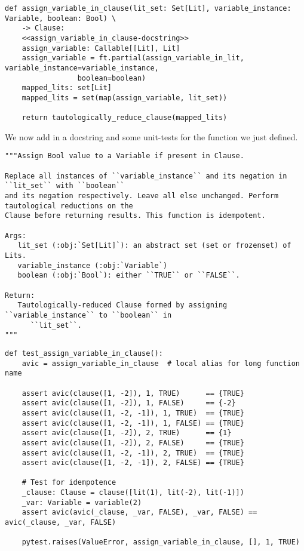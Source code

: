 \documentclass[11pt]{article}
\begin{document}
\begin{verbatim}
def assign_variable_in_clause(lit_set: Set[Lit], variable_instance: Variable, boolean: Bool) \
	-> Clause:
    <<assign_variable_in_clause-docstring>>
    assign_variable: Callable[[Lit], Lit]
    assign_variable = ft.partial(assign_variable_in_lit, variable_instance=variable_instance,
				 boolean=boolean)
    mapped_lits: set[Lit]
    mapped_lits = set(map(assign_variable, lit_set))

    return tautologically_reduce_clause(mapped_lits)
\end{verbatim}

We now add in a docstring and some unit-tests for the function we just defined.
\begin{verbatim}
"""Assign Bool value to a Variable if present in Clause.

Replace all instances of ``variable_instance`` and its negation in ``lit_set`` with ``boolean``
and its negation respectively. Leave all else unchanged. Perform tautological reductions on the
Clause before returning results. This function is idempotent.

Args:
   lit_set (:obj:`Set[Lit]`): an abstract set (set or frozenset) of Lits.
   variable_instance (:obj:`Variable`)
   boolean (:obj:`Bool`): either ``TRUE`` or ``FALSE``.

Return:
   Tautologically-reduced Clause formed by assigning ``variable_instance`` to ``boolean`` in
      ``lit_set``.
"""
\end{verbatim}


\begin{verbatim}
def test_assign_variable_in_clause():
    avic = assign_variable_in_clause  # local alias for long function name

    assert avic(clause([1, -2]), 1, TRUE)      == {TRUE}
    assert avic(clause([1, -2]), 1, FALSE)     == {-2}
    assert avic(clause([1, -2, -1]), 1, TRUE)  == {TRUE}
    assert avic(clause([1, -2, -1]), 1, FALSE) == {TRUE}
    assert avic(clause([1, -2]), 2, TRUE)      == {1}
    assert avic(clause([1, -2]), 2, FALSE)     == {TRUE}
    assert avic(clause([1, -2, -1]), 2, TRUE)  == {TRUE}
    assert avic(clause([1, -2, -1]), 2, FALSE) == {TRUE}

    # Test for idempotence
    _clause: Clause = clause([lit(1), lit(-2), lit(-1)])
    _var: Variable = variable(2)
    assert avic(avic(_clause, _var, FALSE), _var, FALSE) == avic(_clause, _var, FALSE)

    pytest.raises(ValueError, assign_variable_in_clause, [], 1, TRUE)
\end{verbatim}
\end{document}
